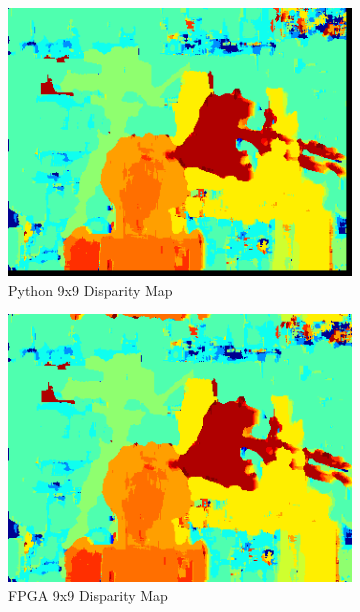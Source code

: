 \begin{figure}
\begin{center}
\begin{subfigure}{0.45\textwidth}
		\includegraphics[width=\textwidth]{figures/tsukuba_9x9_python3.png}
		\caption{Python 9x9 Disparity Map}
		\label{fig:tsukubaPy}
	\end{subfigure}
	\begin{subfigure}{0.45\textwidth}
		\includegraphics[width=\textwidth]{figures/tsukuba_9x9_fpga.png}
		\caption{FPGA 9x9 Disparity Map}
		\label{fig:tsukubaFPGA}
	\end{subfigure}
	\\
	\begin{subfigure}{0.45\textwidth}

\end{subfigure}
\end{center}
\end{figure}
